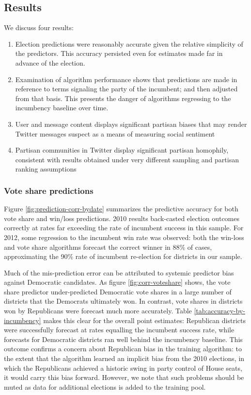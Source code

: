 \documentclass{article}
\begin{document}
\subsection{Results}
\label{sec:results}

We discuss four results:
\begin{enumerate}
\item Election predictions were reasonably accurate given the relative
  simplicity of the predictors. This accuracy persisted even for
  estimates made far in advance of the election.
\item Examination of algorithm performance shows that predictions are
  made in reference to terms signaling the party of the incumbent; and
  then adjusted from that basis. This presents the danger of
  algorithms regressing to the incumbency baseline over time.
\item User and message content displays significant partisan biases
  that may render Twitter messages suspect as a means of measuring
  social sentiment
\item Partisan communities in Twitter display significant partisan
  homophily, consistent with results obtained under very different
  sampling and partisan ranking assumptions
\end{enumerate}

\subsubsection{Vote share predictions}
\label{sec:predictions}

Figure \ref{fig:prediction-corr-bydate} summarizes the predictive
accuracy for both vote share and win/loss predictions. 2010 results
back-casted election outcomes correctly at rates far exceeding the
rate of incumbent success in this sample. For 2012, some regression to
the incumbent win rate was observed: both the win-loss and vote share
algorithms forecast the correct winner in 88\% of cases, approximating
the 90\% rate of incumbent re-election for districts in our sample.

Much of the mis-prediction error can be attributed to systemic
predictor bias against Democratic candidates. As figure
\ref{fig:corr-voteshare} shows, the vote share predictor
under-predicted Democratic vote shares in a large number of districts
that the Democrats ultimately won. In contrast, vote shares in districts
won by Republicans were forecast much more accurately. Table
\ref{tab:accuracy-by-incumbency} makes this clear for the overall
point estimates: Republican districts were successfully forecast at
rates equalling the incumbent success rate, while forecasts for
Democratic districts ran well behind the incumbency baseline. This outcome
confirms a concern about Republican bias in the training algorithm: to
the extent that the algorithm learned an implicit bias from the 2010
elections, in which the Republicans achieved a historic swing in party
control of House seats, it would carry this bias forward. However, we
note that such problems should be muted as data for additional
elections is added to the training pool. 
\end{document}
